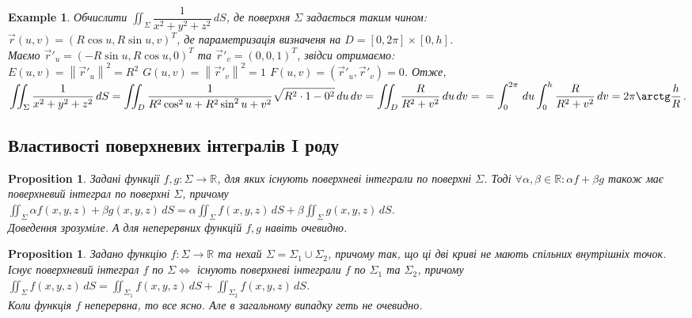 \documentclass[a4paper, 10pt]{article}
\theoremstyle{theoremdd}
\theoremstyle{theoremdd}
\theoremstyle{theoremdd}
\theoremstyle{theoremdd}
\theoremstyle{theoremdd}
\newtheorem{example}[theorem]{Example}
\theoremstyle{theoremdd}
\theoremstyle{theoremdd}
\theoremstyle{theoremdd}
\theoremstyle{theoremdd}
\newtheorem{proposition}[theorem]{Proposition}
\theoremstyle{theoremdd}
\theoremstyle{theoremdd}
\theoremstyle{theoremdd}
\theoremstyle{theoremdd}
\theoremstyle{theoremdd}
\theoremstyle{theoremdd}
\newcommand\Norm[1]{\left\lVert#1\right\rVert}
\begin{document}
\begin{example}
Обчислити $\displaystyle\iint_\Sigma \dfrac{1}{x^2+y^2+z^2}\,dS$, де поверхня $\Sigma$ задається таким чином:\\
$\vec{r}(u,v) = (R \cos u, R \sin u, v)^T$, де параметризація визначеня на $D = [0,2\pi] \times [0,h]$.\\
Маємо $\vec{r}'_u = (-R\sin u, R\cos u, 0)^T$ та $\vec{r}'_v = (0,0,1)^T$, звідси отримаємо:\\
$E(u,v) = \Norm{\vec{r}'_u}^2 = R^2$ \hspace{0.5cm} $G(u,v) = \Norm{\vec{r}'_v}^2 = 1$ \hspace{0.5cm} $F(u,v) = ( \vec{r}'_u, \vec{r}'_v ) = 0$. Отже,\\
$\displaystyle\iint_\Sigma \dfrac{1}{x^2+y^2+z^2}\,dS = \iint_D \dfrac{1}{R^2 \cos^2 u + R^2 \sin^2 u + v^2} \sqrt{R^2 \cdot 1 - 0^2}\,du\,dv = \iint_D \dfrac{R}{R^2+v^2}\,du\,dv = \\ = \int_{0}^{2\pi}\,du \int_0^h \dfrac{R}{R^2+v^2}\,dv = 2\pi \arctg \dfrac{h}{R}$.
\end{example}

\subsection{Властивості поверхневих інтегралів I роду}
\begin{proposition}
Задані функції $f,g: \Sigma \to \mathbb{R}$, для яких існують поверхневі інтеграли по поверхні $\Sigma$. Тоді $\forall \alpha,\beta \in \mathbb{R}: \alpha f + \beta g$ також має поверхневий інтеграл по поверхні $\Sigma$, причому\\
$\displaystyle\iint_\Sigma \alpha f(x,y,z) + \beta g(x,y,z)\,dS = \alpha \iint_\Sigma f(x,y,z)\,dS + \beta \iint_\Sigma g(x,y,z)\,dS$.\\
\textit{Доведення зрозуміле. А для неперервних функцій $f,g$ навіть очевидно.}
\end{proposition}

\begin{proposition}
Задано функцію $f: \Sigma \to \mathbb{R}$ та нехай $\Sigma = \Sigma_1 \cup \Sigma_2$, причому так, що ці дві криві не мають спільних внутрішніх точок.\\
Існує поверхневий інтеграл $f$ по $\Sigma \iff$ існують поверхневі інтеграли $f$ по $\Sigma_1$ та $\Sigma_2$, причому\\
$\displaystyle\iint_\Sigma f(x,y,z)\,dS = \iint_{\Sigma_1} f(x,y,z)\,dS + \iint_{\Sigma_2} f(x,y,z)\,dS$.\\
\textit{Коли функція $f$ неперервна, то все ясно. Але в загальному випадку геть не очевидно.}
\end{proposition}
\end{document}
